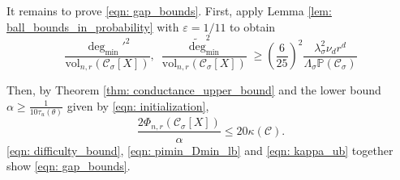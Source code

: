 \documentclass[11pt,twoside]{article}
\newcommand{\vol}{\mathrm{vol}}
\newcommand{\1}{\mathbf{1}}
\newcommand{\Xbf}{X}             %
\newcommand{\Pbb}{\mathbb{P}}
\newcommand{\Cset}{\mathcal{C}}
\newcommand{\Csig}{\Cset_{\sigma}}
\newcommand{\degminpr}{\deg_{\min}'}
\newcommand{\degminwt}{\widetilde{\deg}_{\min}}
\begin{document}
It remains to prove \eqref{eqn: gap_bounds}. First, apply Lemma \ref{lem: ball_bounds_in_probability} with $\varepsilon = 1/11$ to obtain
\begin{equation}
\label{eqn: pimin_Dmin_lb}
\frac{\degminpr^2}{\vol_{n,r}(\Csig[\Xbf])},~ \frac{\degminwt^2}{\vol_{n,r}(\Csig[\Xbf])} \geq \left(\frac{6}{25}\right)^2 \frac{\lambda_{\sigma}^2 \nu_d r^d}{\Lambda_{\sigma}\Pbb(\Csig)}  
\end{equation}

Then, by Theorem \ref{thm: conductance_upper_bound} and the lower bound $\alpha \geq \frac{1}{10 \tau_{u}(\theta)}$ given by \eqref{eqn: initialization},
\begin{equation}
\label{eqn: difficulty_bound}
\frac{2\Phi_{n,r}(\Csig[\Xbf])}{\alpha} \leq 20\kappa(\Cset).
\end{equation}
\eqref{eqn: difficulty_bound}, \eqref{eqn: pimin_Dmin_lb} and \eqref{eqn: kappa_ub} together show \eqref{eqn: gap_bounds}.
\end{document}
